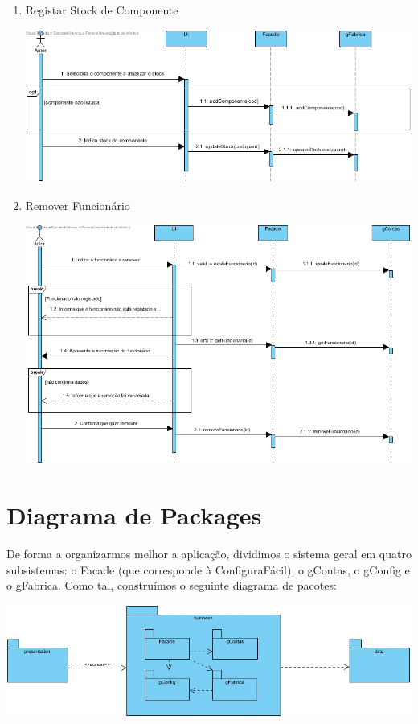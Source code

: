 \documentclass[11pt]{article} %
\begin{document}
\begin{enumerate}
\begin{center}
		\end{center}
	\item Registar Stock de Componente
		\begin{center}
 			\includegraphics[width = 6in]{dsss_registar_stock.png}
		\end{center}
	\item Remover Funcionário
		\begin{center}
 			\includegraphics[width = 6in]{dsss_remover_funcionario.png}
		\end{center}
\end{enumerate}

\section{Diagrama de Packages}
De forma a organizarmos melhor a aplicação, dividimos o sistema geral em quatro subsistemas: o Facade (que corresponde à ConfiguraFácil), o gContas, o gConfig e o gFabrica. Como tal, construímos o seguinte diagrama de pacotes:
\begin{center}
 	\includegraphics[width=6in]{pacotes.jpg}
\end{center}
\end{document}
